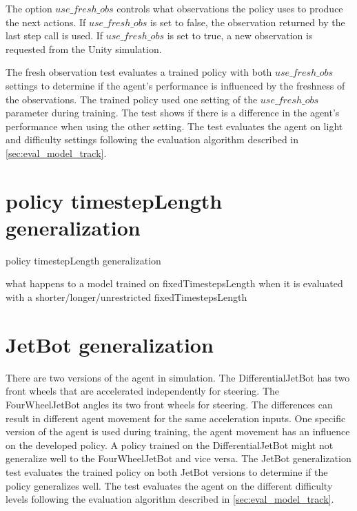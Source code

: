 The option $use\_fresh\_obs$ controls what observations the policy uses to produce the next actions. If $use\_fresh\_obs$ is set to false, the observation returned by the last step call is used. If $use\_fresh\_obs$ is set to true, a new observation is requested from the Unity simulation.

The fresh observation test evaluates a trained policy with both $use\_fresh\_obs$ settings to determine if the agent's performance is influenced by the freshness of the observations. The trained policy used one setting of the $use\_fresh\_obs$ parameter during training. The test shows if there is a difference in the agent's performance when using the other setting. The test evaluates the agent on light and difficulty settings following the evaluation algorithm described in \ref{sec:eval_model_track}.


 






\section{policy timestepLength generalization}

policy timestepLength generalization 

what happens to a model trained on fixedTimestepsLength when it is evaluated with a shorter/longer/unrestricted fixedTimestepsLength


\section{JetBot generalization}

There are two versions of the agent in simulation. The DifferentialJetBot has two front wheels that are accelerated independently for steering. The FourWheelJetBot angles its two front wheels for steering. The differences can result in different agent movement for the same acceleration inputs. One specific version of the agent is used during training, the agent movement has an influence on the developed policy.
A policy trained on the DifferentialJetBot might not generalize well to the FourWheelJetBot and vice versa. The JetBot generalization test evaluates the trained policy on both JetBot versions to determine if the policy generalizes well. The test evaluates the agent on the different difficulty levels following the evaluation algorithm described in \ref{sec:eval_model_track}.



